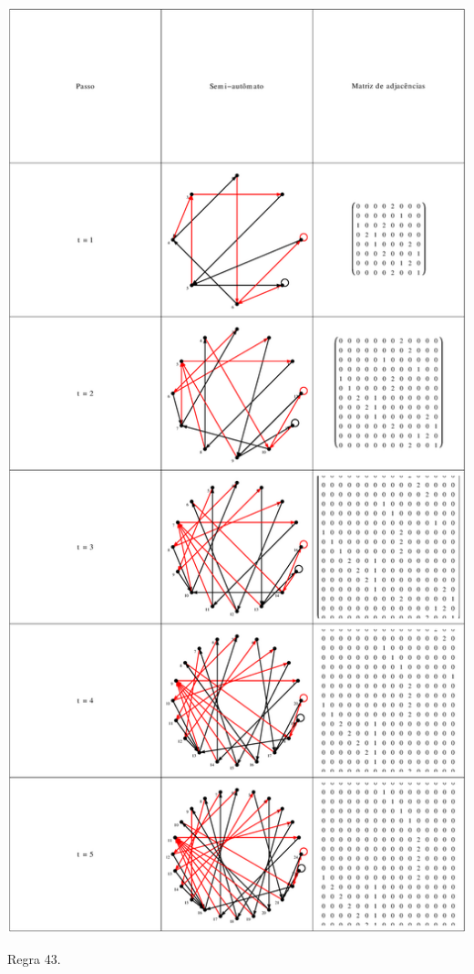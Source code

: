 \documentclass[12pt,a4paper]{article}
\begin{document}
\begin{table}[H]
\begin{center}
\includegraphics[scale=0.32]{img/mat/matr43.eps}
\caption{Regra 43.}
\label{tab:mr43}
\end{center}
\end{table}
\end{document}
